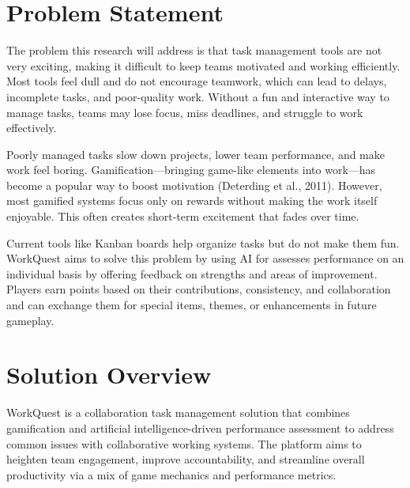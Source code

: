 \section{Problem Statement}
\label{section:problem-statement}

The problem this research will address is that task management tools are not very exciting, making it difficult to keep teams motivated and working efficiently. Most tools feel dull and do not encourage teamwork, which can lead to delays, incomplete tasks, and poor-quality work. Without a fun and interactive way to manage tasks, teams may lose focus, miss deadlines, and struggle to work effectively.

Poorly managed tasks slow down projects, lower team performance, and make work feel boring. Gamification—bringing game-like elements into work—has become a popular way to boost motivation (Deterding et al., 2011). However, most gamified systems focus only on rewards without making the work itself enjoyable. This often creates short-term excitement that fades over time.

Current tools like Kanban boards help organize tasks but do not make them fun. WorkQuest aims to solve this problem by using AI for assesses performance on an individual basis by offering feedback on strengths and areas of improvement. Players earn points based on their contributions, consistency, and collaboration and can exchange them for special items, themes, or enhancements in future gameplay. 

\section{Solution Overview}
\label{section:solution-overview}

WorkQuest is a collaboration task management solution that combines gamification and artificial intelligence-driven 
performance assessment to address common issues with collaborative working systems. The platform aims to heighten team 
engagement, improve accountability, and streamline overall productivity via a mix of game mechanics and performance metrics.

